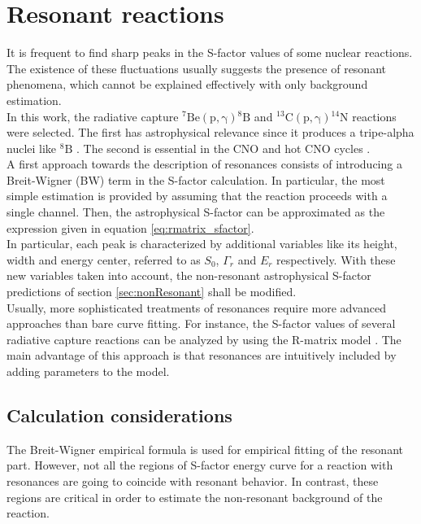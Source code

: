 \documentclass[openany]{book}
\begin{document}
\section{Resonant reactions} \label{sec:resonant}

It is frequent to find sharp peaks in the S-factor values of some nuclear reactions. The existence of these fluctuations usually suggests the presence of resonant phenomena, which cannot be explained effectively with only background estimation. \\

In this work, the radiative capture $\mathrm{{}^{7}{Be}(p, \gamma){}^{8}{B} } $ and $\mathrm{{}^{13}{C}(p, \gamma){}^{14}{N}} $ reactions were selected. The first has astrophysical relevance since it produces a tripe-alpha nuclei like $\mathrm{{}^{8}B}$ \cite{coc_2012}. The second is essential in the CNO and hot CNO cycles \cite{wiescher_gorres_schatz_1999}. \\

A first approach towards the description of resonances consists of introducing a Breit-Wigner (BW) term in the S-factor calculation. In particular, the most simple estimation is provided by assuming that the reaction proceeds with a single channel. Then, the astrophysical S-factor can be approximated as the expression given in equation \ref{eq:rmatrix_sfactor}. \\

In particular, each peak is characterized by additional variables like its height, width and energy center, referred to as $S_0$, $\Gamma_r$ and $E_r$ respectively. With these new variables taken into account, the non-resonant astrophysical S-factor predictions of section \ref{sec:nonResonant} shall be modified.\\

Usually, more sophisticated treatments of resonances require more advanced approaches than bare curve fitting. For instance, the S-factor values of several radiative capture reactions can be analyzed by using the R-matrix model \cite{descouvemont_adahchour_angulo_coc_vangioni-flam_2004}. The main advantage of this approach is that resonances are intuitively included by adding parameters to the model.

\subsection{Calculation considerations} \label{sub:considerationsResonant}

The Breit-Wigner empirical formula is used for empirical fitting of the resonant part. However, not all the regions of S-factor energy curve for a reaction with resonances are going to coincide with resonant behavior. In contrast, these regions are critical in order to estimate the non-resonant background of the reaction.\\
\end{document}
